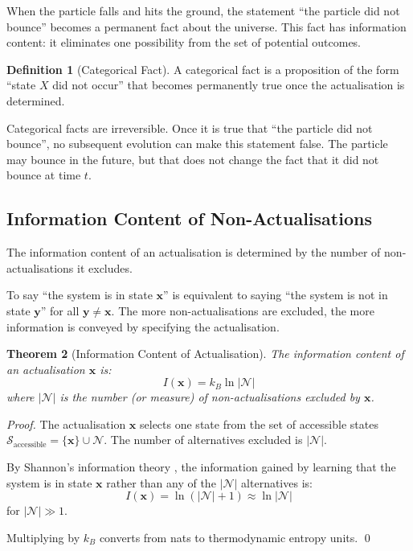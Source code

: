 \documentclass[twocolumn,10pt]{article}
\newtheorem{theorem}{Theorem}[section]
\theoremstyle{definition}
\newtheorem{definition}[theorem]{Definition}
\theoremstyle{remark}
\begin{document}
When the particle falls and hits the ground, the statement ``the particle did not bounce'' becomes a permanent fact about the universe. This fact has information content: it eliminates one possibility from the set of potential outcomes.

\begin{definition}[Categorical Fact]
A categorical fact is a proposition of the form ``state $X$ did not occur'' that becomes permanently true once the actualisation is determined.
\end{definition}

Categorical facts are irreversible. Once it is true that ``the particle did not bounce'', no subsequent evolution can make this statement false. The particle may bounce in the future, but that does not change the fact that it did not bounce at time $t$.

\subsection{Information Content of Non-Actualisations}

The information content of an actualisation is determined by the number of non-actualisations it excludes.

To say ``the system is in state $\mathbf{x}$'' is equivalent to saying ``the system is not in state $\mathbf{y}$'' for all $\mathbf{y} \neq \mathbf{x}$. The more non-actualisations are excluded, the more information is conveyed by specifying the actualisation.

\begin{theorem}[Information Content of Actualisation]
The information content of an actualisation $\mathbf{x}$ is:
$$
I(\mathbf{x}) = k_B \ln |\mathcal{N}|
$$
where $|\mathcal{N}|$ is the number (or measure) of non-actualisations excluded by $\mathbf{x}$.
\end{theorem}

\begin{proof}
The actualisation $\mathbf{x}$ selects one state from the set of accessible states $\mathcal{S}_{\text{accessible}} = \{\mathbf{x}\} \cup \mathcal{N}$. The number of alternatives excluded is $|\mathcal{N}|$.

By Shannon's information theory \cite{shannon1948}, the information gained by learning that the system is in state $\mathbf{x}$ rather than any of the $|\mathcal{N}|$ alternatives is:
$$
I(\mathbf{x}) = \ln(|\mathcal{N}| + 1) \approx \ln |\mathcal{N}|
$$
for $|\mathcal{N}| \gg 1$.

Multiplying by $k_B$ converts from nats to thermodynamic entropy units. \qed
\end{proof}
\end{document}
